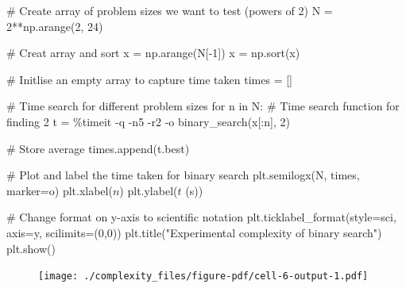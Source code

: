 \documentclass[
  letterpaper,
  DIV=11,
  numbers=noendperiod]{scrreprt}
\newenvironment{Shaded}{\begin{snugshade}}{\end{snugshade}}
\newcommand{\CommentTok}[1]{\textcolor[rgb]{0.37,0.37,0.37}{#1}}
\newcommand{\ControlFlowTok}[1]{\textcolor[rgb]{0.00,0.23,0.31}{#1}}
\newcommand{\DecValTok}[1]{\textcolor[rgb]{0.68,0.00,0.00}{#1}}
\newcommand{\KeywordTok}[1]{\textcolor[rgb]{0.00,0.23,0.31}{#1}}
\newcommand{\NormalTok}[1]{\textcolor[rgb]{0.00,0.23,0.31}{#1}}
\newcommand{\OperatorTok}[1]{\textcolor[rgb]{0.37,0.37,0.37}{#1}}
\newcommand{\StringTok}[1]{\textcolor[rgb]{0.13,0.47,0.30}{#1}}
\theoremstyle{definition}
\theoremstyle{remark}
\begin{document}
\begin{Shaded}
\begin{Highlighting}[]
\CommentTok{\# Create array of problem sizes we want to test (powers of 2)}
\NormalTok{N }\OperatorTok{=} \DecValTok{2}\OperatorTok{**}\NormalTok{np.arange(}\DecValTok{2}\NormalTok{, }\DecValTok{24}\NormalTok{)}

\CommentTok{\# Creat array and sort}
\NormalTok{x }\OperatorTok{=}\NormalTok{ np.arange(N[}\OperatorTok{{-}}\DecValTok{1}\NormalTok{])}
\NormalTok{x }\OperatorTok{=}\NormalTok{ np.sort(x)}

\CommentTok{\# Initlise an empty array to capture time taken}
\NormalTok{times }\OperatorTok{=}\NormalTok{ []}

\CommentTok{\# Time search for different problem sizes}
\ControlFlowTok{for}\NormalTok{ n }\KeywordTok{in}\NormalTok{ N:}
    \CommentTok{\# Time search function for finding \textquotesingle{}2\textquotesingle{}}
\NormalTok{    t }\OperatorTok{=} \OperatorTok{\%}\NormalTok{timeit }\OperatorTok{{-}}\NormalTok{q }\OperatorTok{{-}}\NormalTok{n5 }\OperatorTok{{-}}\NormalTok{r2 }\OperatorTok{{-}}\NormalTok{o binary\_search(x[:n], }\DecValTok{2}\NormalTok{)}

    \CommentTok{\# Store average}
\NormalTok{    times.append(t.best)}

\CommentTok{\# Plot and label the time taken for binary search}
\NormalTok{plt.semilogx(N, times, marker}\OperatorTok{=}\StringTok{\textquotesingle{}o\textquotesingle{}}\NormalTok{)}
\NormalTok{plt.xlabel(}\StringTok{\textquotesingle{}$n$\textquotesingle{}}\NormalTok{)}
\NormalTok{plt.ylabel(}\StringTok{\textquotesingle{}$t$ (s)\textquotesingle{}}\NormalTok{)}

\CommentTok{\# Change format on y{-}axis to scientific notation}
\NormalTok{plt.ticklabel\_format(style}\OperatorTok{=}\StringTok{\textquotesingle{}sci\textquotesingle{}}\NormalTok{, axis}\OperatorTok{=}\StringTok{\textquotesingle{}y\textquotesingle{}}\NormalTok{, scilimits}\OperatorTok{=}\NormalTok{(}\DecValTok{0}\NormalTok{,}\DecValTok{0}\NormalTok{))}
\NormalTok{plt.title(}\StringTok{"Experimental complexity of binary search"}\NormalTok{)}
\NormalTok{plt.show()}
\end{Highlighting}
\end{Shaded}

\begin{figure}[H]

{\centering \texttt{[image: ./complexity\_files/figure-pdf/cell-6-output-1.pdf]}

}

\end{figure}
\end{document}
